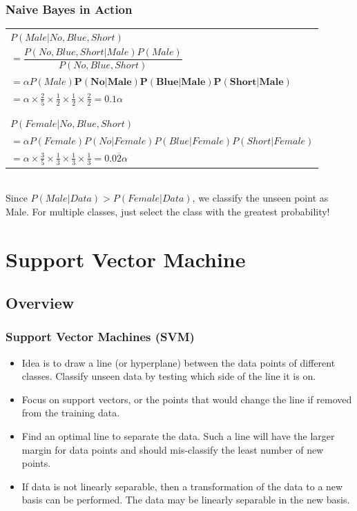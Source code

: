 \documentclass[mathserif]{beamer}
\begin{document}
	\begin{frame}
		\frametitle{Naive Bayes in Action}
		\begin{tabular}{l}
		\(P(Male|No,Blue,Short)\) \\
		\(=\dfrac{P(No,Blue,Short|Male) P(Male)}{P(No,Blue,Short)}\) \\
		\(= \alpha P(Male)\bm{P(No|Male)P(Blue|Male)P(Short|Male)}\) \\
		\(=\alpha \times \frac{2}{5} \times \frac{1}{2} \times \frac{1}{2} \times \frac{2}{2} = \boxed{0.1\alpha}\) \\ \\
		\hline \\
		\(P(Female|No,Blue,Short)\) \\
		\(=\alpha P(Female)P(No|Female)P(Blue|Female)P(Short|Female)\) \\
		\(= \alpha \times \frac{3}{5} \times \frac{1}{3} \times \frac{1}{3} \times \frac{1}{3} = \boxed{0.0\overline{2}\alpha}\) \\
		\end{tabular} \\
		\vspace{10px}
		Since \(P(Male|Data) > P(Female|Data)\), we classify the unseen point as Male. For multiple classes, just select the class with the greatest probability!
	\end{frame} 
	
	\section{Support Vector Machine}
	\subsection{Overview}
	\begin{frame}
		\frametitle{Support Vector Machines (SVM)}
		\begin{itemize}
			\item Idea is to draw a line (or hyperplane) between the data points of different classes. Classify unseen data by testing which side of the line it is on.
			\item Focus on support vectors, or the points that would change the line if removed from the training data.
			\item Find an optimal line to separate the data. Such a line will have the larger margin for data points and should mis-classify the least number of new points.
			\item If data is not linearly separable, then a transformation of the data to a new basis can be performed. The data may be linearly separable in the new basis.
		\end{itemize}
	\end{frame}
	
\end{document}

